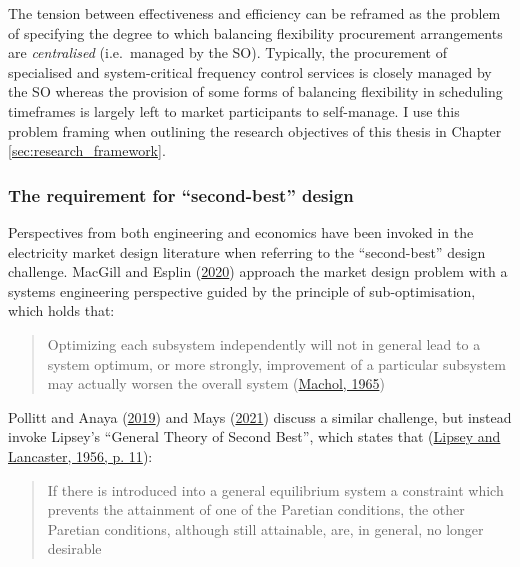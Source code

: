 \documentclass[12pt,a4paper,]{report}
\begin{document}
The tension between effectiveness and efficiency can be reframed as the
problem of specifying the degree to which balancing flexibility
procurement arrangements are \emph{centralised} (i.e.~managed by the
SO). Typically, the procurement of specialised and system-critical
frequency control services is closely managed by the SO whereas the
provision of some forms of balancing flexibility in scheduling
timeframes is largely left to market participants to self-manage. I use
this problem framing when outlining the research objectives of this
thesis in Chapter \ref{sec:research_framework}.

\hypertarget{sec:lit_review-design-challenges-secondbest}{%
\subsubsection{The requirement for ``second-best''
design}\label{sec:lit_review-design-challenges-secondbest}}

Perspectives from both engineering and economics have been invoked in
the electricity market design literature when referring to the
``second-best'' design challenge. MacGill and Esplin
(\protect\hyperlink{ref-macgillEndtoendElectricityMarket2020}{2020})
approach the market design problem with a systems engineering
perspective guided by the principle of sub-optimisation, which holds
that:

\begin{quote}
Optimizing each subsystem independently will not in general lead to a
system optimum, or more strongly, improvement of a particular subsystem
may actually worsen the overall system
(\protect\hyperlink{ref-machol1965system}{Machol, 1965})
\end{quote}

Pollitt and Anaya
(\protect\hyperlink{ref-pollittCompetitionMarketsAncillary2019}{2019})
and Mays
(\protect\hyperlink{ref-maysMissingIncentivesFlexibility2021}{2021})
discuss a similar challenge, but instead invoke Lipsey's ``General
Theory of Second Best'', which states that
(\protect\hyperlink{ref-lipseyGeneralTheorySecond1956}{Lipsey and
Lancaster, 1956, p. 11}):

\begin{quote}
If there is introduced into a general equilibrium system a constraint
which prevents the attainment of one of the Paretian conditions, the
other Paretian conditions, although still attainable, are, in general,
no longer desirable
\end{quote}
\end{document}
